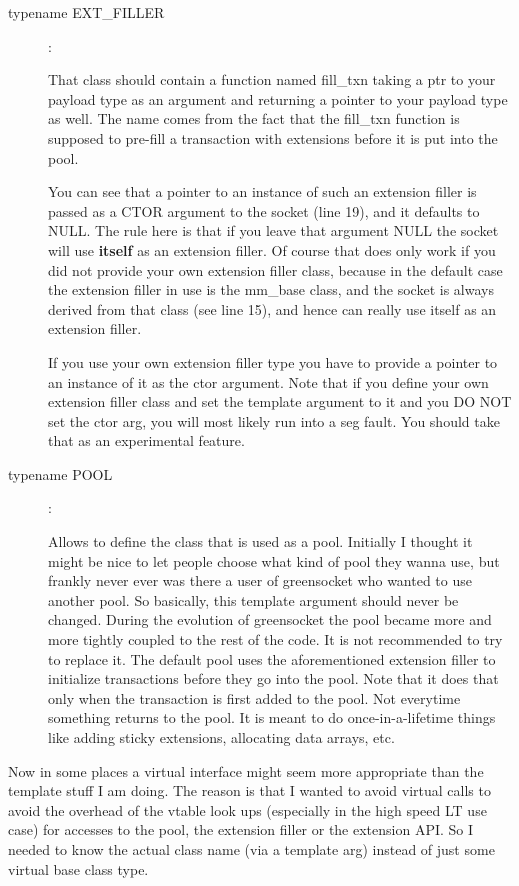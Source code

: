 \documentclass[a4paper,10pt]{article}          %
\newcommand{\code}[1]{{\ttfamily#1}}
\begin{document}
\begin{description}
\item[\code{typename EXT\_FILLER}]:

That class should contain a function named \code{fill\_txn} taking a ptr to your payload type as an argument and returning a pointer to your payload type as well. The name comes from the fact that the \code{fill\_txn} function is supposed to pre-fill a transaction with extensions before it is put into the pool.

You can see that a pointer to an instance of such an extension filler is passed as a CTOR argument to the socket (line 19), and it defaults to \code{NULL}. The rule here is that if you leave that argument \code{NULL} the socket will use \textbf{itself} as an extension filler. Of course that does only work if you did not provide your own extension filler class, because in the default case the extension filler in use is the \code{mm\_base} class, and the socket is always derived from that class (see line 15), and hence can really use itself as an extension filler.

If you use your own extension filler type you have to provide a pointer to an instance of it as the ctor argument. Note that if you define your own extension filler class and set the template argument to it and you DO NOT set the ctor arg, you will most likely run into a seg fault. You should take that as an experimental feature.

\item[\code{typename POOL}]:

Allows to define the class that is used as a pool. Initially I thought it might be nice to let people choose what kind of pool they wanna use, but frankly never ever was there a user of greensocket who wanted to use another pool. So basically, this template argument should never be changed. During the evolution of greensocket the pool became more and more tightly coupled to the rest of the code. It is not recommended to try to replace it. The default pool uses the aforementioned extension filler to initialize transactions before they go into the pool. Note that it does that only when the transaction is first added to the pool. Not everytime something returns to the pool. It is meant to do once-in-a-lifetime things like adding sticky extensions, allocating data arrays, etc.

\end{description}
 
Now in some places a virtual interface might seem more appropriate than the template stuff I am doing. The reason is that I wanted to avoid virtual calls to avoid the overhead of the vtable look ups (especially in the high speed LT use case) for accesses to the pool, the extension filler or the extension API. So I needed to know the actual class name (via a template arg) instead of just some virtual base class type.
\end{document}
